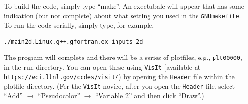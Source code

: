 To build the code, simply type ``make''.  An exectubale will appear that has some indication (but not complete)
about what setting you used in the {\tt GNUmakefile}.  To run the code serially, simply type, for example,
\begin{lstlisting}[language={[gnu]make},mathescape=false]
./main2d.Linux.g++.gfortran.ex inputs_2d
\end{lstlisting}
The program will complete and there will be a series of plotfiles, e.g., {\tt plt00000}, in the run directory.
You can open these using {\tt VisIt} (available at {\tt https://wci.llnl.gov/codes/visit/}) by opening
the {\tt Header} file within the plotfile directory.  (For the {\tt VisIt} novice, after you open the {\tt Header}
file, select ``Add'' $\rightarrow$ ``Pseudocolor'' $\rightarrow$ ``Variable 2'' and then click ``Draw''.)
